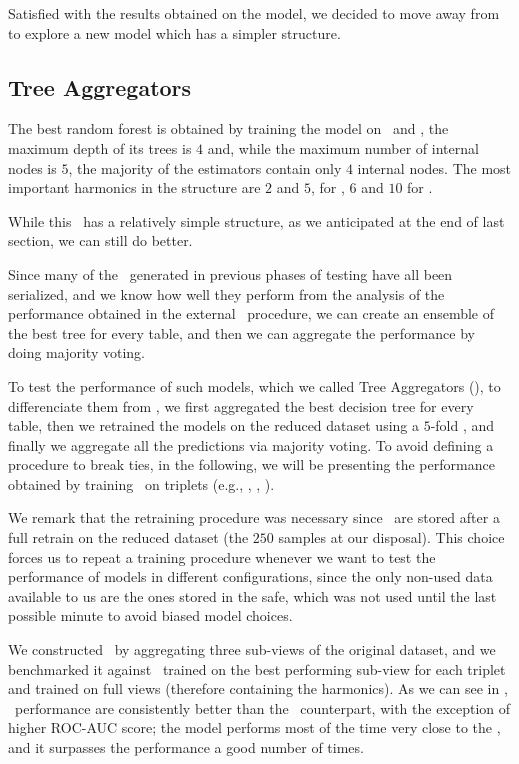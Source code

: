 Satisfied with the results obtained on the model, we decided to move away from \rfs to explore a new
model which has a simpler structure.

\subsection{Tree Aggregators}
The best random forest is obtained by training the model on \an\ and \cnmod, the maximum depth of
its trees is $4$ and, while the maximum number of internal nodes is $5$, the majority of the
estimators contain only $4$ internal nodes. The most important harmonics in the structure are $2$ and $5$, for \cnmod, $6$ and $10$ for \phin.

While this \rf\ has a relatively simple structure, as we anticipated at the end of last section, we
can still do better.

Since many of the \dts\ generated in previous phases of testing have all been serialized, and we
know how well they perform from the analysis of the performance obtained in the external \cv\
procedure, we can create an ensemble of the best tree for every table, and then we can aggregate the
performance by doing majority voting.

To test the performance of such models, which we called Tree Aggregators (\tas), to differenciate them from
\rfs, we first aggregated the best decision tree for every table, then we retrained the
models on the reduced dataset using a $5$-fold \cv, and finally we aggregate all the predictions via
majority voting. To avoid defining a procedure to break ties, in the following, we will be
presenting the performance obtained by training \tas\ on triplets (e.g., \an, \bn, \cnmod).

We remark that the retraining procedure was necessary since \dts\ are stored after a full retrain on
the reduced dataset (the $250$ samples at our disposal). This choice forces us to repeat a
training procedure whenever we want to test the performance of models in different configurations,
since the only non-used data available to us are the ones stored in the safe, which was not used
until the last possible minute to avoid biased model choices.

We constructed \tas\ by aggregating three sub-views of the original dataset, and we benchmarked it
against \rfs\ trained on the best performing sub-view for each triplet and \svcs trained on full views (therefore
containing the harmonics). As we can see in \Cref{fig:triplets-performance}, \tas\ performance are
consistently better than the \rf\ counterpart, with the exception of higher ROC-AUC score; the
model performs most of the time very close to the \svc, and it surpasses the performance a good
number of times.

